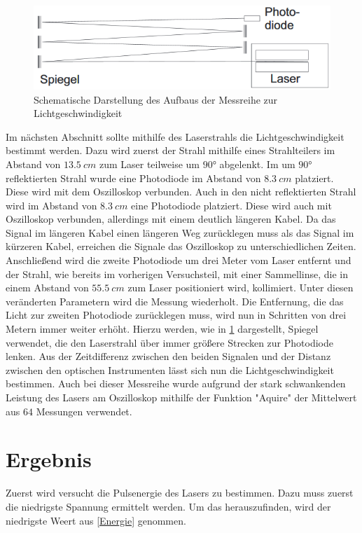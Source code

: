 \documentclass[
	a4paper,
	12pt,
	pagesize,
	ngerman
]{scrartcl}
\begin{document}
\begin{figure}[h!]
	\centering
	\includegraphics[scale=0.9]{skizze_c.png}
	\caption{Schematische Darstellung des Aufbaus der Messreihe zur Lichtgeschwindigkeit}
	\label{skizze_c}
\end{figure}

Im nächsten Abschnitt sollte mithilfe des Laserstrahls die Lichtgeschwindigkeit bestimmt werden. Dazu wird zuerst der Strahl mithilfe eines Strahlteilers im Abstand von $\SI{13,5}{cm}$ zum Laser teilweise um $90$° abgelenkt. Im um $90$° reflektierten Strahl wurde eine Photodiode im Abstand von $\SI{8,3}{cm}$ platziert. Diese wird mit dem Oszilloskop verbunden. Auch in den nicht reflektierten Strahl wird im Abstand von $\SI{8,3}{cm}$ eine Photodiode platziert. Diese wird auch mit Oszilloskop verbunden, allerdings mit einem deutlich längeren Kabel. Da das Signal im längeren Kabel einen längeren Weg zurücklegen muss als das Signal im kürzeren Kabel, erreichen die Signale das Oszilloskop zu unterschiedlichen Zeiten.
Anschließend wird die zweite Photodiode um drei Meter vom Laser entfernt und der Strahl, wie bereits im vorherigen Versuchsteil, mit einer Sammellinse, die in einem Abstand von $\SI{55,5}{cm}$ zum Laser positioniert wird, kollimiert. Unter diesen veränderten Parametern wird die Messung wiederholt. Die Entfernung, die das Licht zur zweiten Photodiode zurücklegen muss, wird nun in Schritten von drei Metern immer weiter erhöht. Hierzu werden, wie in \cref{skizze_c} dargestellt, Spiegel verwendet, die den Laserstrahl über immer größere Strecken zur Photodiode lenken.
Aus der Zeitdifferenz zwischen den beiden Signalen und der Distanz zwischen den optischen Instrumenten lässt sich nun die Lichtgeschwindigkeit bestimmen.
Auch bei dieser Messreihe wurde aufgrund der stark schwankenden Leistung des Lasers am Oszilloskop mithilfe der Funktion "Aquire" der Mittelwert aus $64$ Messungen verwendet.

\section{Ergebnis}
Zuerst wird versucht die Pulsenergie des Lasers zu bestimmen. Dazu muss zuerst die niedrigste Spannung ermittelt werden. Um das herauszufinden, wird der niedrigste Weert aus \cref{Energie} genommen. 
\end{document}
